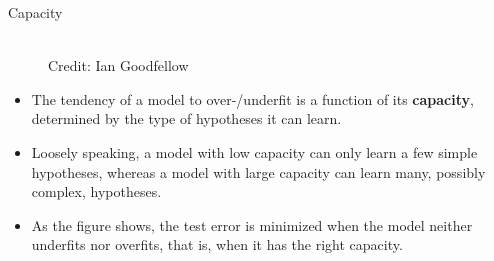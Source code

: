 \begin{vbframe} {Capacity}
  \begin{figure}
    \centering
      \tiny{\\ Credit: Ian Goodfellow}
  \end{figure}
  \begin{itemize}
    \item The tendency of a model to over-/underfit is a function of its \textbf{capacity}, determined by the type of hypotheses it can learn.
    \item Loosely speaking, a model with low capacity can only learn a few simple hypotheses, whereas a model with large capacity can learn many, possibly complex, hypotheses.
    \item As the figure shows, the test error is minimized when the model neither underfits nor overfits, that is, when it has the right capacity.
  \end{itemize}
\end{vbframe}

